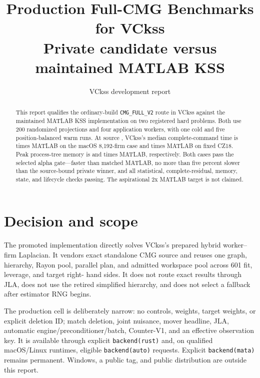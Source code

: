 \documentclass[10pt]{article}
\title{Production Full-CMG Benchmarks for VCkss\\
\large Private \PackageVersion{} candidate versus maintained MATLAB KSS}
\author{VCkss development report}
\date{\ReportDate}
\newcommand{\code}[1]{\texttt{#1}}
\begin{document}
\maketitle

\begin{abstract}
This report qualifies the ordinary-build \code{CMG\_FULL\_V2} route in VCkss
against the maintained MATLAB KSS implementation on two registered hard
problems. Both use 200 randomized projections and four application workers,
with one cold and five position-balanced warm runs. At source
\texttt{\RuntimeShort{}}, VCkss's median complete-command time is
\MacRatio{} times MATLAB on the macOS 8,192-firm case and \SccRatio{} times
MATLAB on fixed CZ18. Peak process-tree memory is \MacRssRatio{} and
\SccRssRatio{} times MATLAB, respectively. Both cases pass the selected alpha
gate---faster than matched MATLAB, no more than five percent slower than the
source-bound private winner, and all statistical, complete-residual, memory,
state, and lifecycle checks passing. The aspirational 2x MATLAB target is not
claimed.
\end{abstract}

\section{Decision and scope}

The promoted implementation directly solves VCkss's prepared hybrid
worker--firm Laplacian. It vendors exact standalone CMG source
\texttt{\CmgShort{}} and reuses one graph, hierarchy, Rayon pool, parallel
plan, and admitted workspace pool across 601 fit, leverage, and target right-
hand sides. It does not route exact results through JLA, does not use the
retired simplified hierarchy, and does not select a fallback after estimator
RNG begins.

The production cell is deliberately narrow: no controls, weights, target
weights, or explicit deletion ID; match deletion, joint nuisance, mover
headline, JLA, automatic engine/preconditioner/batch, Counter-V1, and an
effective observation key. It is available through explicit
\code{backend(rust)} and, on qualified macOS/Linux runtimes, eligible
\code{backend(auto)} requests. Explicit \code{backend(mata)} remains
permanent. Windows, a public tag, and public distribution are outside this
report.
\end{document}
